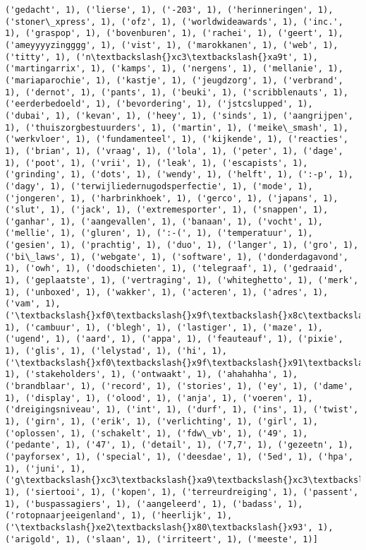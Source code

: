 \documentclass{article}
\begin{document}
\begin{Verbatim}[commandchars=\\\{\}]
('gedacht', 1), ('lierse', 1), ('-203', 1), ('herinneringen', 1), ('stoner\_xpress', 1), ('ofz', 1), ('worldwideawards', 1), ('inc.', 1), ('graspop', 1), ('bovenburen', 1), ('rachei', 1), ('geert', 1), ('ameyyyyzingggg', 1), ('vist', 1), ('marokkanen', 1), ('web', 1), ('titty', 1), ('n\textbackslash{}xc3\textbackslash{}xa9t', 1), ('martingarrix', 1), ('kamps', 1), ('nergens', 1), ('mellanie', 1), ('mariaparochie', 1), ('kastje', 1), ('jeugdzorg', 1), ('verbrand', 1), ('dernot', 1), ('pants', 1), ('beuki', 1), ('scribblenauts', 1), ('eerderbedoeld', 1), ('bevordering', 1), ('jstcslupped', 1), ('dubai', 1), ('kevan', 1), ('heey', 1), ('sinds', 1), ('aangrijpen', 1), ('thuiszorgbestuurders', 1), ('martin', 1), ('meike\_smash', 1), ('werkvloer', 1), ('fundamenteel', 1), ('kijkende', 1), ('reacties', 1), ('brian', 1), ('vraag', 1), ('lola', 1), ('peter', 1), ('dage', 1), ('poot', 1), ('vrii', 1), ('leak', 1), ('escapists', 1), ('grinding', 1), ('dots', 1), ('wendy', 1), ('helft', 1), (':-p', 1), ('dagy', 1), ('terwijliedernugodsperfectie', 1), ('mode', 1), ('jongeren', 1), ('harbrinkhoek', 1), ('gerco', 1), ('japans', 1), ('slut', 1), ('jack', 1), ('extremesporter', 1), ('snappen', 1), ('ganhar', 1), ('aangevallen', 1), ('banaan', 1), ('vocht', 1), ('mellie', 1), ('gluren', 1), (':-(', 1), ('temperatuur', 1), ('gesien', 1), ('prachtig', 1), ('duo', 1), ('langer', 1), ('gro', 1), ('bi\_laws', 1), ('webgate', 1), ('software', 1), ('donderdagavond', 1), ('owh', 1), ('doodschieten', 1), ('telegraaf', 1), ('gedraaid', 1), ('geplaatste', 1), ('vertraging', 1), ('whiteghetto', 1), ('merk', 1), ('unboxed', 1), ('wakker', 1), ('acteren', 1), ('adres', 1), ('vam', 1), ('\textbackslash{}xf0\textbackslash{}x9f\textbackslash{}x8c\textbackslash{}xb8\textbackslash{}xf0\textbackslash{}x9f\textbackslash{}x8d\textbackslash{}x83', 1), ('cambuur', 1), ('blegh', 1), ('lastiger', 1), ('maze', 1), ('ugend', 1), ('aard', 1), ('appa', 1), ('feauteauf', 1), ('pixie', 1), ('glis', 1), ('lelystad', 1), ('hi', 1), ('\textbackslash{}xf0\textbackslash{}x9f\textbackslash{}x91\textbackslash{}xae\textbackslash{}xf0\textbackslash{}x9f\textbackslash{}x94\textbackslash{}xab\textbackslash{}xe2\textbackslash{}x9d\textbackslash{}x97', 1), ('stakeholders', 1), ('ontwaakt', 1), ('ahahahha', 1), ('brandblaar', 1), ('record', 1), ('stories', 1), ('ey', 1), ('dame', 1), ('display', 1), ('olood', 1), ('anja', 1), ('voeren', 1), ('dreigingsniveau', 1), ('int', 1), ('durf', 1), ('ins', 1), ('twist', 1), ('girn', 1), ('erik', 1), ('verlichting', 1), ('girl', 1), ('oplossen', 1), ('schakelt', 1), ('fdw\_vb', 1), ('49', 1), ('pedante', 1), ('47', 1), ('detail', 1), ('7,7', 1), ('gezeetn', 1), ('payforsex', 1), ('special', 1), ('deesdae', 1), ('5ed', 1), ('hpa', 1), ('juni', 1), ('g\textbackslash{}xc3\textbackslash{}xa9\textbackslash{}xc3\textbackslash{}xa9n', 1), ('siertooi', 1), ('kopen', 1), ('terreurdreiging', 1), ('passent', 1), ('buspassagiers', 1), ('aangeleerd', 1), ('badass', 1), ('rotopnaarjeeigenland', 1), ('heerlijk', 1), ('\textbackslash{}xe2\textbackslash{}x80\textbackslash{}x93', 1), ('arigold', 1), ('slaan', 1), ('irriteert', 1), ('meeste', 1)]
    \end{Verbatim}
\end{document}
